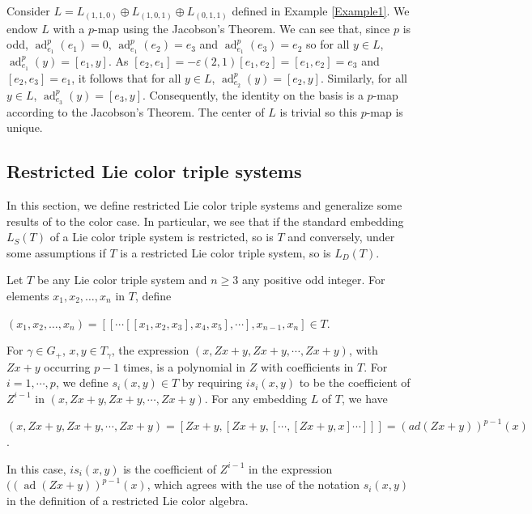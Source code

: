\documentclass[11pt, twoside]{article}
\DeclareMathOperator{\ad}{ad}
\begin{document}
\begin{ex}
   Consider  $L= L_{(1,1,0)}\oplus L_{(1,0,1)} \oplus L_{(0,1,1)} $ defined in Example \ref{Example1}. We endow $L$ with a $p$-map using the Jacobson's Theorem. We can see that, since $p$ is odd, $\ad_{e_1}^p(e_1)=0 $, $\ad_{e_1}^p(e_2)=e_3 $ and $\ad_{e_1}^p(e_3)= e_2 $ so for all $y\in L$, $\ad_{e_1}^p(y)= [e_1,y] $. As $[e_2,e_1] = -\varepsilon(2,1)[e_1,e_2]=[e_1,e_2]=e_3 $ and $[e_2,e_3]=e_1 $, it follows that for all $y\in L $, $\ad_{e_2}^p(y)=[e_2,y] $. Similarly, for all $y\in L$, $\ad_{e_3}^p(y)=[e_3,y] $. Consequently, the identity on the basis is a $p$-map according to the Jacobson's Theorem. The center of $L$ is trivial so this $p$-map is unique. 
\end{ex}

\subsection{Restricted Lie color triple systems}\label{s4}
In this section, we define restricted Lie color triple systems and generalize some results of \cite{H01} to the color case. In particular, we see that if the standard embedding $L_S(T) $ of a Lie color triple system is restricted, so is $T$ and conversely, under some assumptions if $T$ is a restricted Lie color triple system, so is $L_D(T) $. \newline

Let $T$ be any Lie color triple system and $n\geq 3$ any positive odd integer. For elements $x_1,x_2,\dots , x_n $ in $T$, define \begin{center}
    $(x_1,x_2,\dots,x_n)= [[\cdots [[x_1,x_2,x_3],x_4,x_5],\cdots],x_{n-1},x_n] \in T$.
\end{center} For $\gamma\in G_+ $, $x,y\in T_\gamma $, the expression $(x,Zx+y,Zx+y,\cdots , Zx+y) $, with $Zx+y$ occurring $p-1$ times, is a polynomial in $Z$ with coefficients in $T$. For $i=1,\cdots,p $, we define $s_i(x,y) \in T$ by requiring $is_i(x,y)$ to be the coefficient of $Z^{i-1} $ in $(x,Zx+y,Zx+y,\cdots,Zx+y) $. For any embedding $L$ of $T$, we have \begin{center}
    $(x,Zx+y,Zx+y,\cdots,Zx+y)= [Zx+y,[Zx+y,[\cdots ,[Zx+y,x]\cdots]]] = (ad(Zx+y))^{p-1}(x) $.
\end{center} In this case, $is_i(x,y) $ is the coefficient of $Z^{i-1} $ in the expression $((\ad(Zx+y))^{p-1}(x) $, which agrees with the use of the notation $s_i(x,y) $ in the definition of a restricted Lie color algebra. 
\end{document}
